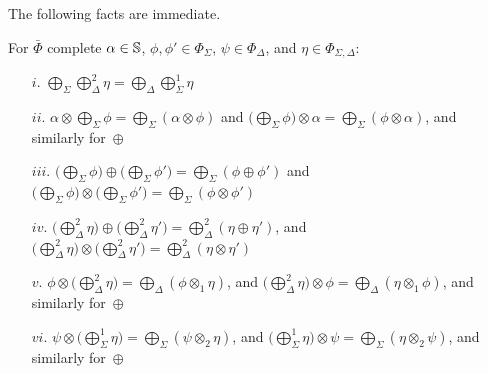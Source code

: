The following facts are immediate.
%
\begin{lemma}
For $\bar\Phi$ complete %
$\alpha \in \mathbb{S}$,
$\phi, \phi' \in \Phi_{\Sigma}$,
$\psi \in \Phi_{\Delta}$, and
$\eta \in \Phi_{\Sigma, \Delta}$:
%
\begin{enumerate}
\item[$i.$]
\( \bigoplus_{\Sigma}\bigoplus^2_{\Delta} \eta = \bigoplus_{\Delta}\bigoplus^1_{\Sigma} \eta \)
\item[$ii.$]
\( \alpha \otimes \bigoplus_{\Sigma} \phi = \bigoplus_{\Sigma} (\alpha \otimes \phi) \) and
\( \bigl( \bigoplus_{\Sigma} \phi \bigr) \otimes\alpha = \bigoplus_{\Sigma} (\phi \otimes \alpha) \),
and similarly for~$\oplus$
\item[$iii.$]
\( \bigl(\bigoplus_{\Sigma} \phi\bigr) \oplus \bigl(\bigoplus_{\Sigma} \phi'\bigr)
   = \bigoplus_{\Sigma} (\phi \oplus \phi') \) and
\( \bigl(\bigoplus_{\Sigma} \phi\bigr) \otimes \bigl(\bigoplus_{\Sigma} \phi'\bigr)
   = \bigoplus_{\Sigma} (\phi \otimes \phi') \)
\item[$iv.$]
\( \bigl(\bigoplus^2_{\Delta} \eta\bigr) \oplus \bigl(\bigoplus^2_{\Delta} \eta' \bigr) =
 \bigoplus^2_{\Delta} (\eta \oplus \eta') \), and
\( \bigl(\bigoplus^2_{\Delta} \eta\bigr) \otimes \bigl(\bigoplus^2_{\Delta} \eta' \bigr) =
 \bigoplus^2_{\Delta} (\eta \otimes \eta') \)
\item[$v.$]
\( \phi \otimes \bigl(\bigoplus^2_{\Delta} \eta\bigr) = \bigoplus_{\Delta} (\phi \otimes_1 \eta) \), and
\( \bigl(\bigoplus^2_{\Delta} \eta\bigr) \otimes \phi = \bigoplus_{\Delta} (\eta \otimes_1 \phi) \),
and similarly for~$\oplus$
\item[$vi.$]
\( \psi \otimes \bigl(\bigoplus^1_{\Sigma} \eta\bigr) = \bigoplus_{\Sigma} (\psi \otimes_2 \eta) \), and
\( \bigl(\bigoplus^1_{\Sigma} \eta\bigr) \otimes \psi = \bigoplus_{\Sigma} (\eta \otimes_2 \psi) \),
and similarly for~$\oplus$
\end{enumerate}
\end{lemma}


